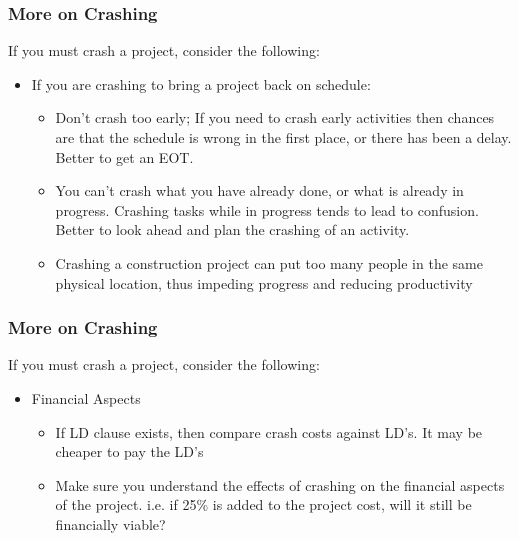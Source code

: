\begin{frame}
\frametitle{More on Crashing}
If you must crash a project, consider the following:
\begin{itemize}
	\item If you are crashing to bring a project back on schedule:
			\begin{itemize}
				\item Don't crash too early; If you need to crash early activities then chances are that the schedule is wrong in the first place, or there has been a delay.  Better to get an EOT.
				\item You can’t crash what you have already done, or what is already in progress.  Crashing tasks while in progress tends to lead to confusion.  Better to look ahead and plan the crashing of an activity.
				\item Crashing a construction project can put too many people in the same physical location, thus impeding progress and reducing productivity
			\end{itemize}
		
\end{itemize}
\end{frame}



\begin{frame}
\frametitle{More on Crashing}
If you must crash a project, consider the following:
\begin{itemize}
	\item Financial Aspects
		\begin{itemize}
			\item If LD clause exists, then compare crash costs against LD’s.  It may be cheaper to pay the LD’s
			\item Make sure you understand the effects of crashing on the financial aspects of the project.  i.e. if 25\% is added to the project cost, will it still be financially viable?
		\end{itemize}
\end{itemize}
\end{frame}







